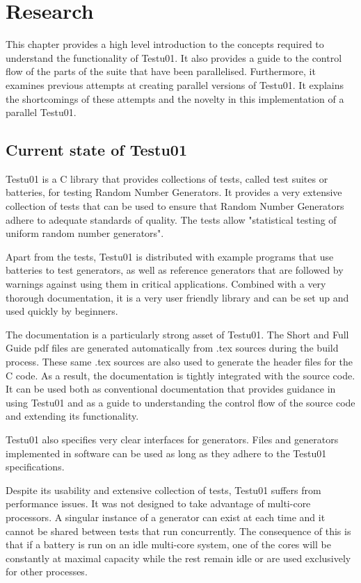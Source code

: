 \chapter{Research}
\label{cha:res}
This chapter provides a high level introduction to the concepts required to understand the functionality of Testu01. It also provides a guide to the control flow of the parts of the suite that have been parallelised. 
Furthermore, it examines previous attempts at creating parallel versions of Testu01. It explains the shortcomings of these attempts and the novelty in this implementation of a parallel Testu01.

\section{Current state of Testu01}
Testu01 is a C library that provides collections of tests, called test suites or batteries, for testing Random Number Generators. It provides a very extensive collection of tests that can be used to ensure that Random Number Generators adhere to adequate standards of quality. The tests allow "statistical testing of uniform random number generators"\cite{testu01-homepage}.

Apart from the tests, Testu01 is distributed with example programs that use batteries to test generators, as well as reference generators that are followed by warnings against using them in critical applications. Combined with a very thorough documentation, it is a very user friendly library and can be set up and used quickly by beginners.

The documentation is a particularly strong asset of Testu01. The Short and Full Guide pdf files are generated automatically from .tex sources during the build process. These same .tex sources are also used to generate the header files for the C code. As a result, the documentation is tightly integrated with the source code. It can be used both as conventional documentation that provides guidance in using Testu01 and as a guide to understanding the control flow of the source code and extending its functionality.

Testu01 also specifies very clear interfaces for generators. Files and generators implemented in software can be used as long as they adhere to the Testu01 specifications.

Despite its usability and extensive collection of tests, Testu01 suffers from performance issues. It was not designed to take advantage of multi-core processors. A singular instance of a generator can exist at each time and it cannot be shared between tests that run concurrently. The consequence of this is that if a battery is run on an idle multi-core system, one of the cores will be constantly at maximal capacity while the rest remain idle or are used exclusively for other processes.

